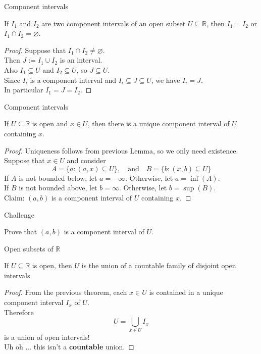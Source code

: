 \documentclass{beamer}
\begin{document}
\begin{frame}{Component intervals}
\begin{lemma}
If $I_1$ and $I_2$ are two component intervals of an open subset $U\subseteq\mathbb{R}$, then $I_1=I_2$ or $I_1\cap I_2 = \varnothing$.
\end{lemma}
\pause
\begin{proof}
\pause
Suppose that $I_1\cap I_2 \neq \varnothing$.\\
\pause
Then $J := I_1\cup I_2$ is an interval.\\
\pause
Also $I_1\subseteq U$ and $I_2\subseteq U$, so $J\subseteq U$.\\
\pause
Since $I_i$ is a component interval and $I_i\subseteq J\subseteq U$, we have $I_i = J$.\\
\pause
In particular $I_1 = J = I_2$.
\end{proof}
\end{frame}

\begin{frame}{Component intervals}
\begin{thm}[Apostol 3.10]
If $U\subseteq\mathbb{R}$ is open and $x\in U$, then there is a unique component interval of $U$ containing $x$.
\end{thm}
\pause
\begin{proof}
Uniqueness follows from previous Lemma, so we only need existence.\\
\pause
Suppose that $x\in U$ and consider
$$A = \{a: (a,x)\subseteq U\},\quad\text{and}\quad B = \{b: (x,b)\subseteq U\}$$
\pause
If $A$ is not bounded below, let $a=-\infty$.  Otherwise, let $a = \inf (A)$.\\
\pause
If $B$ is not bounded above, let $b=\infty$.  Otherwise, let $b = \sup (B)$.\\
\pause
Claim: $(a,b)$ is a component interval of $U$ containing $x$.
\end{proof}
\end{frame}

\begin{frame}{Challenge}
\begin{prob}
Prove that $(a,b)$ is a component interval of $U$.
\end{prob}
\end{frame}

\begin{frame}{Open subsets of $\mathbb{R}$}
\begin{thm}
If $U\subseteq\mathbb{R}$ is open, then $U$ is the union of a countable family of disjoint open intervals.
\end{thm}
\pause
\begin{proof}
From the previous theorem, each $x\in U$ is contained in a unique component interval $I_x$ of $U$.\\
\pause
Therefore
$$U = \bigcup_{x\in U} I_x$$
is a union of open intervals!\\
\pause
{\color{red}Uh oh ... this isn't a \textbf{countable} union.}
\end{proof}
\end{frame}
\end{document}
